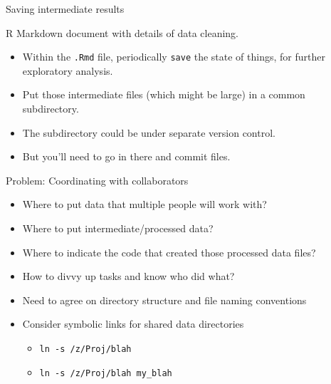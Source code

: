 \documentclass[12pt,t]{beamer}
\newcommand{\hilit}{\color{hilit}}
\newcommand{\bi}{\begin{itemize}}
\newcommand{\ei}{\end{itemize}}
\begin{document}
\begin{frame}{Saving intermediate results}

\vspace{24pt}

{\hilit R Markdown document with details of data cleaning.}

\bi
\item Within the {\tt .Rmd} file, periodically {\tt save} the state of
  things, for further exploratory analysis.

\item Put those intermediate files (which might be large) in a common
  subdirectory.

\item The subdirectory could be under {\hilit separate} version
  control.

\item But you'll need to {\hilit go in there} and commit files.
\ei


\end{frame}




\begin{frame}{Problem: Coordinating with collaborators}

\vspace{24pt}

\bi
\item Where to put data that multiple people will work with?
\item Where to put intermediate/processed data?
\item Where to indicate the code that created those processed data files?
\item How to divvy up tasks and know who did what?
\ei

\vspace{12pt}

\bi
\item Need to agree on directory structure and file naming conventions
\item Consider symbolic links for shared data directories
\bi
\item[] {\tt ln -s /z/Proj/blah}
\item[] {\tt ln -s /z/Proj/blah my\_blah}
\ei
\ei

\end{frame}
\end{document}
